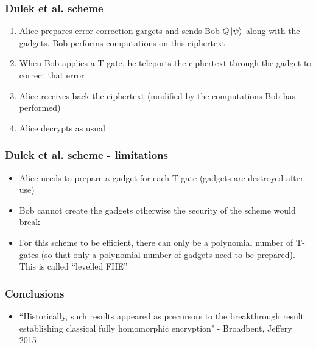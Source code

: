 \begin{frame}
 \frametitle{Dulek et al. scheme}
 \begin{enumerate}
   \item Alice prepares error correction gargets and sends Bob $Q\left\vert{\psi}\right\rangle$ along with the gadgets. Bob performs computations on this ciphertext
   \item When Bob applies a T-gate, he teleports the ciphertext through the gadget to correct that error
   \item Alice receives back the ciphertext (modified by the computations Bob has performed)
   \item Alice decrypts as usual
\end{enumerate}
\end{frame}
 
\begin{frame}
\frametitle{Dulek et al. scheme - limitations}
\begin{itemize}
  \item Alice needs to prepare a gadget for each T-gate (gadgets are destroyed after use)
  \item Bob cannot create the gadgets otherwise the security of the scheme would break 
  \item For this scheme to be efficient, there can only be a polynomial number of T-gates (so that only a polynomial number of gadgets need to be prepared). This is called ``levelled FHE'' 
\end{itemize}
\end{frame}
 
\begin{frame}
\frametitle{Conclusions}
\begin{itemize}
  \item ``Historically, such results appeared as precursors to the breakthrough result establishing classical fully homomorphic encryption" - Broadbent, Jeffery 2015
  \end{itemize}
  \end{frame}
 
